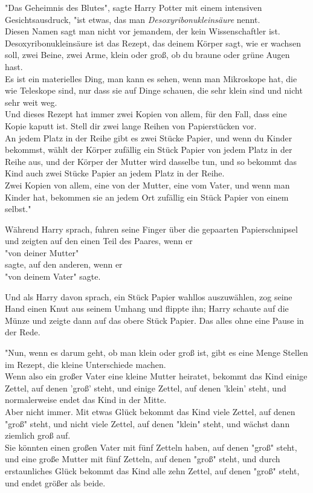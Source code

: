 {"Das Geheimnis des Blutes", sagte Harry Potter mit einem intensiven Gesichtsausdruck, "ist etwas, das man \emph{Desoxyribonukleinsäure} nennt.\\ Diesen Namen sagt man nicht vor jemandem, der kein Wissenschaftler ist. Desoxyribonukleinsäure ist das Rezept, das deinem Körper sagt, wie er wachsen soll, zwei Beine, zwei Arme, klein oder groß, ob du braune oder grüne Augen hast.\\ Es ist ein materielles Ding, man kann es sehen, wenn man Mikroskope hat, die wie Teleskope sind, nur dass sie auf Dinge schauen, die sehr klein sind und nicht sehr weit weg.\\ Und dieses Rezept hat immer zwei Kopien von allem, für den Fall, dass eine Kopie kaputt ist. Stell dir zwei lange Reihen von Papierstücken vor.\\ An jedem Platz in der Reihe gibt es zwei Stücke Papier, und wenn du Kinder bekommst, wählt der Körper zufällig ein Stück Papier von jedem Platz in der Reihe aus, und der Körper der Mutter wird dasselbe tun, und so bekommt das Kind auch zwei Stücke Papier an jedem Platz in der Reihe.\\ Zwei Kopien von allem, eine von der Mutter, eine vom Vater, und wenn man Kinder hat, bekommen sie an jedem Ort zufällig ein Stück Papier von einem selbst."

Während Harry sprach, fuhren seine Finger über die gepaarten Papierschnipsel und zeigten auf den einen Teil des Paares, wenn er\\ "von deiner Mutter"\\ sagte, auf den anderen, wenn er\\ "von deinem Vater" sagte.

Und als Harry davon sprach, ein Stück Papier wahllos auszuwählen, zog seine Hand einen Knut aus seinem Umhang und flippte ihn; Harry schaute auf die Münze und zeigte dann auf das obere Stück Papier. Das alles ohne eine Pause in der Rede.

"Nun, wenn es darum geht, ob man klein oder groß ist, gibt es eine Menge Stellen im Rezept, die kleine Unterschiede machen.\\ Wenn also ein großer Vater eine kleine Mutter heiratet, bekommt das Kind einige Zettel, auf denen 'groß' steht, und einige Zettel, auf denen 'klein' steht, und normalerweise endet das Kind in der Mitte.\\ Aber nicht immer. Mit etwas Glück bekommt das Kind viele Zettel, auf denen\\ "groß" steht, und nicht viele Zettel, auf denen "klein" steht, und wächst dann ziemlich groß auf.\\ Sie könnten einen großen Vater mit fünf Zetteln haben, auf denen "groß" steht, und eine große Mutter mit fünf Zetteln, auf denen "groß" steht, und durch erstaunliches Glück bekommt das Kind alle zehn Zettel, auf denen "groß" steht, und endet größer als beide.

}
